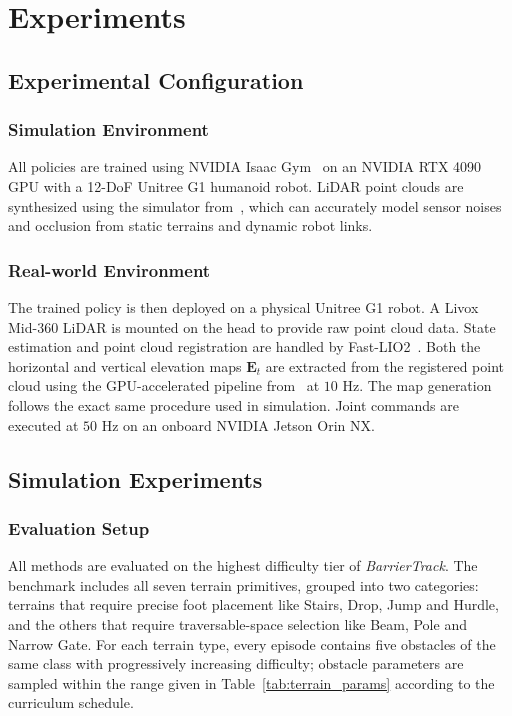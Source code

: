 \section{Experiments}
\label{sec:experiment}

\subsection{Experimental Configuration}
\label{sec:method_terrain}

\subsubsection{Simulation Environment} All policies are trained using NVIDIA Isaac Gym~\cite{Isaac_Gym} on an NVIDIA RTX 4090 GPU with a 12-DoF Unitree G1 humanoid robot. LiDAR point clouds are synthesized using the simulator from~\cite{Wang_2025_Omni-Perception}, which can accurately model sensor noises and occlusion from static terrains and dynamic robot links.

\subsubsection{Real-world Environment} The trained policy is then deployed on a physical Unitree G1 robot. A Livox Mid-360 LiDAR is mounted on the head to provide raw point cloud data. State estimation and point cloud registration are handled by Fast-LIO2~\cite{Xu_2022_FAST-LIO2}. Both the horizontal and vertical elevation maps $\mathbf{E}_t$ are extracted from the registered point cloud using the GPU-accelerated pipeline from~\cite{ElevationMap_GPU_2022} at $10$ Hz. 
The map generation follows the exact same procedure used in simulation. Joint commands are executed at $50$ Hz on an onboard NVIDIA Jetson Orin NX.

\subsection{Simulation Experiments}
\subsubsection{Evaluation Setup}
All methods are evaluated on the highest difficulty tier of \textit{BarrierTrack}. The benchmark includes all seven terrain primitives, grouped into two categories: terrains that require precise foot placement like Stairs, Drop, Jump and Hurdle, and the others that require traversable-space selection like Beam, Pole and Narrow Gate. For each terrain type, every episode contains five obstacles of the same class with progressively increasing difficulty; obstacle parameters are sampled within the range given in Table~\ref{tab:terrain_params} according to the curriculum schedule.


